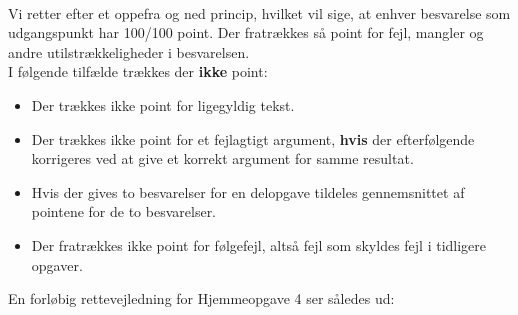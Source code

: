 \documentclass{article}
\begin{document}
\vspace*{0.2cm}\\
Vi retter efter et oppefra og ned princip, hvilket vil sige, at enhver besvarelse som udgangspunkt har 100/100 point. Der fratrækkes så point for fejl, mangler og andre utilstrækkeligheder i besvarelsen.
\vspace*{0.2cm}\\
I følgende tilfælde trækkes der \textbf{ikke} point:
\begin{itemize}
	\item Der trækkes ikke point for ligegyldig tekst.
	\item Der trækkes ikke point for et fejlagtigt argument, \textbf{hvis} der efterfølgende korrigeres ved at give et korrekt argument for samme resultat. 
	\item Hvis der gives to besvarelser for en delopgave tildeles gennemsnittet af pointene for de to besvarelser.
	\item Der fratrækkes ikke point for følgefejl, altså fejl som skyldes fejl i tidligere opgaver.
\end{itemize}

En forløbig rettevejledning for Hjemmeopgave 4 ser således ud:
\end{document}
